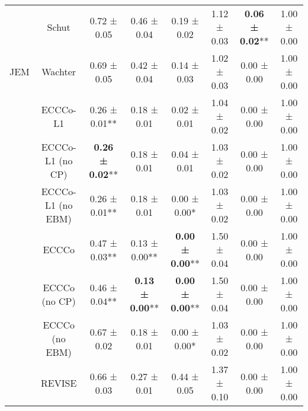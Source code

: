 \begin{table}
{\begin{tabular}[t]{cccccccc}
 & Schut & 0.72 ± 0.05\hphantom{*}\hphantom{*} & 0.46 ± 0.04\hphantom{*}\hphantom{*} & 0.19 ± 0.02\hphantom{*}\hphantom{*} & 1.12 ± 0.03\hphantom{*}\hphantom{*} & \textbf{0.06 ± 0.02}** & 1.00 ± 0.00\hphantom{*}\hphantom{*}\\

\multirow[t]{-9}{*}{\centering\arraybackslash JEM} & Wachter & 0.69 ± 0.05\hphantom{*}\hphantom{*} & 0.42 ± 0.04\hphantom{*}\hphantom{*} & 0.14 ± 0.03\hphantom{*}\hphantom{*} & 1.02 ± 0.03\hphantom{*}\hphantom{*} & 0.00 ± 0.00\hphantom{*}\hphantom{*} & 1.00 ± 0.00\hphantom{*}\hphantom{*}\\
\cmidrule{1-8}
 & ECCCo-L1 & 0.26 ± 0.01** & 0.18 ± 0.01\hphantom{*}\hphantom{*} & 0.02 ± 0.01\hphantom{*}\hphantom{*} & 1.04 ± 0.02\hphantom{*}\hphantom{*} & 0.00 ± 0.00\hphantom{*}\hphantom{*} & 1.00 ± 0.00\hphantom{*}\hphantom{*}\\

 & ECCCo-L1 (no CP) & \textbf{0.26 ± 0.02}** & 0.18 ± 0.01\hphantom{*}\hphantom{*} & 0.04 ± 0.01\hphantom{*}\hphantom{*} & 1.03 ± 0.02\hphantom{*}\hphantom{*} & 0.00 ± 0.00\hphantom{*}\hphantom{*} & 1.00 ± 0.00\hphantom{*}\hphantom{*}\\

 & ECCCo-L1 (no EBM) & 0.26 ± 0.01** & 0.18 ± 0.01\hphantom{*}\hphantom{*} & 0.00 ± 0.00*\hphantom{*} & 1.03 ± 0.02\hphantom{*}\hphantom{*} & 0.00 ± 0.00\hphantom{*}\hphantom{*} & 1.00 ± 0.00\hphantom{*}\hphantom{*}\\

 & ECCCo & 0.47 ± 0.03** & 0.13 ± 0.00** & \textbf{0.00 ± 0.00}** & 1.50 ± 0.04\hphantom{*}\hphantom{*} & 0.00 ± 0.00\hphantom{*}\hphantom{*} & 1.00 ± 0.00\hphantom{*}\hphantom{*}\\

 & ECCCo (no CP) & 0.46 ± 0.04** & \textbf{0.13 ± 0.00}** & \textbf{0.00 ± 0.00}** & 1.50 ± 0.04\hphantom{*}\hphantom{*} & 0.00 ± 0.00\hphantom{*}\hphantom{*} & 1.00 ± 0.00\hphantom{*}\hphantom{*}\\

 & ECCCo (no EBM) & 0.67 ± 0.02\hphantom{*}\hphantom{*} & 0.18 ± 0.01\hphantom{*}\hphantom{*} & 0.00 ± 0.00*\hphantom{*} & 1.03 ± 0.02\hphantom{*}\hphantom{*} & 0.00 ± 0.00\hphantom{*}\hphantom{*} & 1.00 ± 0.00\hphantom{*}\hphantom{*}\\

 & REVISE & 0.66 ± 0.03\hphantom{*}\hphantom{*} & 0.27 ± 0.01\hphantom{*}\hphantom{*} & 0.44 ± 0.05\hphantom{*}\hphantom{*} & 1.37 ± 0.10\hphantom{*}\hphantom{*} & 0.00 ± 0.00\hphantom{*}\hphantom{*} & 1.00 ± 0.00\hphantom{*}\hphantom{*}\\


\end{tabular}}
\end{table}
